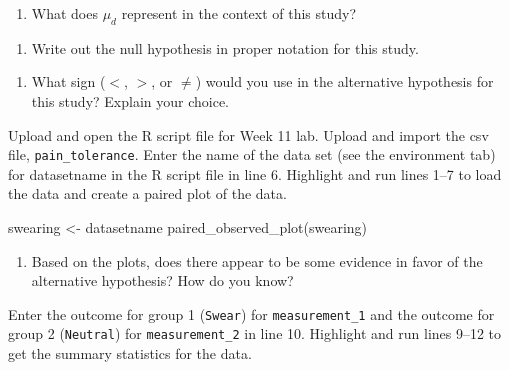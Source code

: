 \documentclass[
]{report}
\newenvironment{Shaded}{\begin{snugshade}}{\end{snugshade}}
\newcommand{\FunctionTok}[1]{\textcolor[rgb]{0.00,0.00,0.00}{#1}}
\newcommand{\NormalTok}[1]{#1}
\newcommand{\OtherTok}[1]{\textcolor[rgb]{0.56,0.35,0.01}{#1}}
\providecommand{\tightlist}{%
  \setlength{\itemsep}{0pt}\setlength{\parskip}{0pt}}
\begin{document}
\begin{enumerate}
\def\labelenumi{\arabic{enumi}.}
\setcounter{enumi}{3}
\tightlist
\item
  What does \(\mu_d\) represent in the context of this study?
\end{enumerate}

\vspace{0.8in}

\begin{enumerate}
\def\labelenumi{\arabic{enumi}.}
\setcounter{enumi}{4}
\tightlist
\item
  Write out the null hypothesis in proper notation for this study.
\end{enumerate}

\vspace{0.8in}

\begin{enumerate}
\def\labelenumi{\arabic{enumi}.}
\setcounter{enumi}{5}
\tightlist
\item
  What sign (\(<\), \(>\), or \(\neq\)) would you use in the alternative hypothesis for this study? Explain your choice.
\end{enumerate}

\vspace{0.5in}

Upload and open the R script file for Week 11 lab. Upload and import the csv file, \texttt{pain\_tolerance}. Enter the name of the data set (see the environment tab) for datasetname in the R script file in line 6. Highlight and run lines 1--7 to load the data and create a paired plot of the data.

\begin{Shaded}
\begin{Highlighting}[]
\NormalTok{swearing }\OtherTok{\textless{}{-}}\NormalTok{ datasetname}
\FunctionTok{paired\_observed\_plot}\NormalTok{(swearing)}
\end{Highlighting}
\end{Shaded}

\begin{enumerate}
\def\labelenumi{\arabic{enumi}.}
\setcounter{enumi}{6}
\tightlist
\item
  Based on the plots, does there appear to be some evidence in favor of the alternative hypothesis? How do you know?
  \vspace{0.4in}
\end{enumerate}

Enter the outcome for group 1 (\texttt{Swear}) for \texttt{measurement\_1} and the outcome for group 2 (\texttt{Neutral}) for \texttt{measurement\_2} in line 10. Highlight and run lines 9--12 to get the summary statistics for the data.
\end{document}
